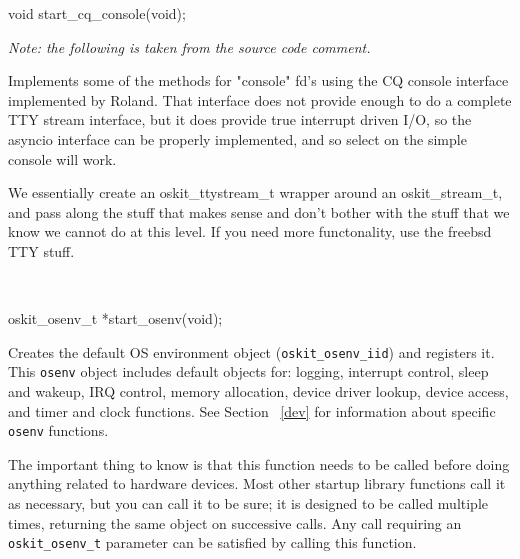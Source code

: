 \label{start-cq-console}
\begin{apisyn}

	\funcproto void start_cq_console(void);
\end{apisyn}
\begin{apidesc}
	\emph{Note: the following is taken from the source code comment.}

	Implements some of the methods for "console" fd's
	using the CQ console interface implemented by Roland. That interface
	does not provide enough to do a complete TTY stream interface, but
	it does provide true interrupt driven I/O, so the asyncio interface
	can be properly implemented, and so select on the simple console
	will work.

	We essentially create an oskit_ttystream_t wrapper around an
	oskit_stream_t, and pass along the stuff that makes sense and
	don't bother with the stuff that we know we cannot do at this level.
	If you need more functonality, use the freebsd TTY stuff.
\end{apidesc}

\label{start-osenv}
\begin{apisyn}
	 \\

	\funcproto oskit_osenv_t *start_osenv(void);
\end{apisyn}
\begin{apidesc}
	Creates the default OS environment object (\texttt{oskit_osenv_iid})
	and registers it.
	This \texttt{osenv} object includes default objects for:
	logging, interrupt control, sleep and wakeup, IRQ control,
	memory allocation, device driver lookup, device access,
	and timer and clock functions.  See Section ~\ref{dev} for
	information about specific \texttt{osenv} functions.

	The important thing to know is that this function needs to be
	called before doing anything related to hardware devices.
	Most other startup library functions call it as necessary,
	but you can call it to be sure; it is designed to be called
	multiple times, returning the same object on successive calls.
	Any call requiring an \texttt{oskit_osenv_t} parameter can be
	satisfied by calling this function.
\end{apidesc}

